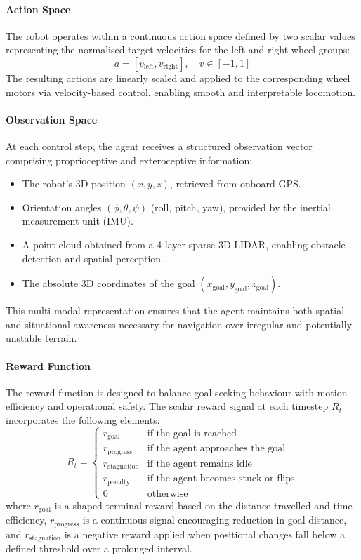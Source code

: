\documentclass[conference]{IEEEtran}
\begin{document}
\paragraph{Action Space}

The robot operates within a continuous action space defined by two scalar values representing the normalised target velocities for the left and right wheel groups:
\[
a = [v_{\text{left}}, v_{\text{right}}], \quad v \in [-1, 1]
\]
The resulting actions are linearly scaled and applied to the corresponding wheel motors via velocity-based control, enabling smooth and interpretable locomotion.

\paragraph{Observation Space}

At each control step, the agent receives a structured observation vector comprising proprioceptive and exteroceptive information:
\begin{itemize}
    \item The robot's 3D position $(x, y, z)$, retrieved from onboard GPS.
    \item Orientation angles $(\phi, \theta, \psi)$ (roll, pitch, yaw), provided by the inertial measurement unit (IMU).
    \item A point cloud obtained from a 4-layer sparse 3D LIDAR, enabling obstacle detection and spatial perception.
    \item The absolute 3D coordinates of the goal $(x_{\text{goal}}, y_{\text{goal}}, z_{\text{goal}})$.
\end{itemize}

This multi-modal representation ensures that the agent maintains both spatial and situational awareness necessary for navigation over irregular and potentially unstable terrain.

\paragraph{Reward Function}

The reward function is designed to balance goal-seeking behaviour with motion efficiency and operational safety. The scalar reward signal at each timestep \( R_t \) incorporates the following elements:
\[
R_t =
\begin{cases}
r_{\text{goal}} & \text{if the goal is reached} \\
r_{\text{progress}} & \text{if the agent approaches the goal} \\
r_{\text{stagnation}} & \text{if the agent remains idle} \\
r_{\text{penalty}} & \text{if the agent becomes stuck or flips} \\
0 & \text{otherwise}
\end{cases}
\]
where \( r_{\text{goal}} \) is a shaped terminal reward based on the distance travelled and time efficiency, \( r_{\text{progress}} \) is a continuous signal encouraging reduction in goal distance, and \( r_{\text{stagnation}} \) is a negative reward applied when positional changes fall below a defined threshold over a prolonged interval.
\end{document}
